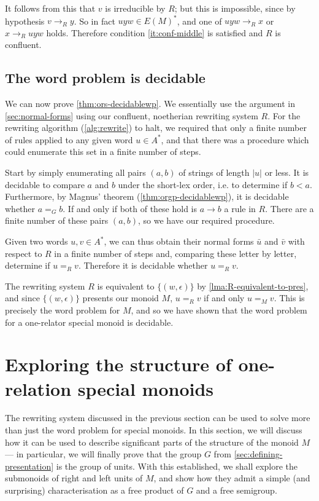 \documentclass[noindex,noinsetproof,12pt]{lmaths}
\begin{document}
It follows from this that $v$ is irreducible by $R$; but this is impossible, since by hypothesis $v \to_R y$. So in fact $uyw \in E(M)^*$, and one of $uyw \to_R x$ or $x \to_R uyw$ holds. Therefore condition \ref{it:conf-middle} is satisfied and $R$ is confluent.


\subsection{The word problem is decidable}

We can now prove \cref{thm:ors-decidablewp}. We essentially use the argument in \cref{sec:normal-forms} using our confluent, noetherian rewriting system $R$. For the rewriting algorithm (\cref{alg:rewrite}) to halt, we required that only a finite number of rules applied to any given word $u \in A^*$, and that there was a procedure which could enumerate this set in a finite number of steps.

Start by simply enumerating all pairs $(a, b)$ of strings of length $|u|$ or less. It is decidable to compare $a$ and $b$ under the short-lex order, i.e. to determine if $b < a$. Furthermore, by Magnus' theorem (\cref{thm:orgp-decidablewp}), it is decidable whether $a =_G b$. If and only if both of these hold is $a \to b$ a rule in $R$. There are a finite number of these pairs $(a, b)$, so we have our required procedure.

Given two words $u, v \in A^*$, we can thus obtain their normal forms $\bar u$ and $\bar v$ with respect to $R$ in a finite number of steps and, comparing these letter by letter, determine if $u =_R v$. Therefore it is decidable whether $u =_R v$.

The rewriting system $R$ is equivalent to $\{(w, \epsilon)\}$ by \cref{lma:R-equivalent-to-pres}, and since $\{(w, \epsilon)\}$ presents our monoid $M$, $u =_R v$ if and only $u =_M v$. This is precisely the word problem for $M$, and so we have shown that the word problem for a one-relator special monoid is decidable.


\section{Exploring the structure of one-relation special monoids}

The rewriting system discussed in the previous section can be used to solve more than just the word problem for special monoids. In this section, we will discuss how it can be used to describe significant parts of the structure of the monoid $M$ --- in particular, we will finally prove that the group $G$ from \cref{sec:defining-presentation} is the group of units. With this established, we shall explore the submonoids of right and left units of $M$, and show how they admit a simple (and surprising) characterisation as a free product of $G$ and a free semigroup.
\end{document}
